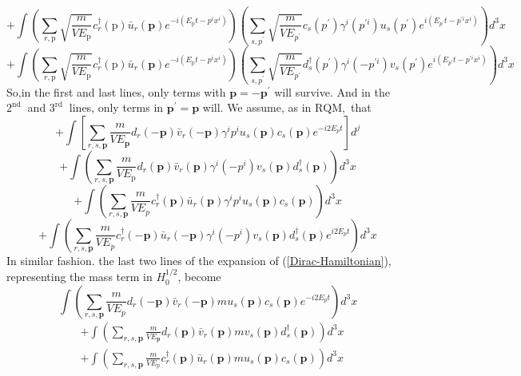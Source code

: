 $$
+\int\left(\sum_{r, \mathrm{p}} \sqrt{\frac{m}{V E_{\mathrm{p}}}} c^{\dagger}_{r}(\mathrm{p}) \bar{u}_{r}(\mathbf{p}) e^{-i\left(E_{\mathrm{p}} t-p^{i} x^{i}\right)}\right)\left(\sum_{s, p^{\prime}} \sqrt{\frac{m}{V E_{p^{\prime}}}} c_{s}\left(p^{\prime}\right) \gamma^{i}\left(p^{\prime i}\right) u_{s}\left(p^{\prime}\right) e^{i\left(E_{p^{\prime}}t-p^{\prime i} x^{i}\right)}\right) d^{3} x
$$
$$
+\int\left(\sum_{r, \mathrm{p}} \sqrt{\frac{m}{V E_{\mathrm{p}}}} c^{\dagger}_{r}(\mathrm{p}) \bar{u}_{r}(\mathbf{p}) e^{-i\left(E_{\mathrm{p}} t-p^{i} x^{i}\right)}\right)\left(\sum_{s, p^{\prime}} \sqrt{\frac{m}{V E_{p^{\prime}}}} d^{\dagger}_{s}\left(p^{\prime}\right) \gamma^{i}\left(-p^{\prime i}\right) v_{s}\left(p^{\prime}\right) e^{i\left(E_{p^{\prime}}t-p^{\prime i} x^{i}\right)}\right) d^{3} x
$$
So,in the first and last lines, only terms with $\mathbf{p}=-\mathbf{p}^{\prime}$ will survive. And in the $2^{\text {nd }}$ and $3^{\text {rd }}$ lines, only terms in $\mathbf{p}^{\prime}=\mathbf{p}$ will. We assume, as in $\mathrm{RQM},$ that \textbf{}
$$
+\int\left[\sum_{r, s, \mathbf{p}} \frac{m}{V E_{\mathbf{p}}} d_{r}(-\mathbf{p}) \bar{v}_{r}(-\mathbf{p}) \gamma^{i} p^{i} u_{s}(\mathbf{p}) c_{s}(\mathbf{p}) e^{-i 2 E_{p} t}\right] d^{j}
$$
$$
+\int\left(\sum_{r, s, \mathbf{p}} \frac{m}{V E_{\mathrm{p}}} d_{r}(\mathbf{p}) \bar{v}_{r}(\mathbf{p}) \gamma^{i}\left(-p^{i}\right) v_{s}(\mathbf{p}) d_{s}^{\dagger}(\mathbf{p})\right) d^{3} x
$$
$$
+\int\left(\sum_{r, s, \mathbf{p}} \frac{m}{V E_{p}} c_{r}^{\dagger}(\mathbf{p}) \bar{u}_{r}(\mathbf{p}) \gamma^{i} p^{i} u_{s}(\mathbf{p}) c_{s}(\mathbf{p})\right) d^{3} x
$$
$$
+\int\left(\sum_{r, s, \mathbf{p}} \frac{m}{V E_{p}} c_{r}^{\dagger}(-\mathbf{p}) \bar{u}_{r}(-\mathbf{p}) \gamma^{i}\left(-p^{i}\right) v_{s}(\mathbf{p}) d_{s}^{\dagger}(\mathbf{p}) e^{i 2 E_{p} t}\right) d^{3} x
$$
In similar fashion. the last two lines of the expansion of (\ref{Dirac-Hamiltonian}), representing the mass term in $H^{1/2}_0$, become
$$
\int\left(\sum_{r, s, \mathbf{p}} \frac{m}{V E_{p}} d_{r}(-\mathbf{p}) \bar{v}_{r}(-\mathbf{p}) m u_{s}(\mathbf{p}) c_{s}(\mathbf{p}) e^{-i 2 E_{p} t}\right) d^{3} x
$$
$$
\begin{aligned}
&+\int\left(\sum_{r, s, \mathbf{p}} \frac{m}{V E_{\mathbf{p}}} d_{r}(\mathbf{p}) \bar{v}_{r}(\mathbf{p}) m v_{s}(\mathbf{p}) d_{s}^{\dagger}(\mathbf{p})\right) d^{3} x\\
&+\int\left(\sum_{r, s, \mathbf{p}} \frac{m}{V E_{\mathrm{p}}} c_{r}^{\dagger}(\mathbf{p}) \bar{u}_{r}(\mathbf{p}) m u_{s}(\mathbf{p}) c_{s}(\mathbf{p})\right) d^{3} x
\end{aligned}
$$
